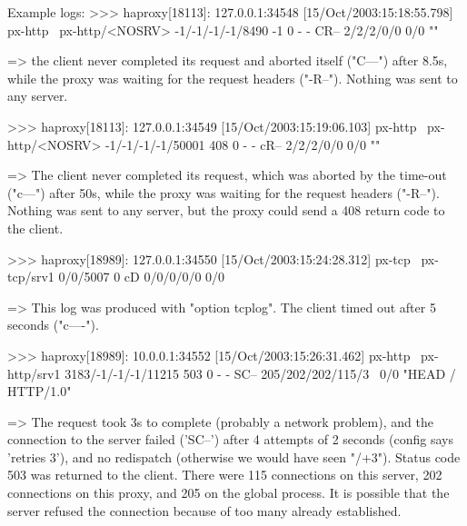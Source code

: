 \begin{example}{Example logs:}
    >>> haproxy[18113]: 127.0.0.1:34548 [15/Oct/2003:15:18:55.798] px-http \
          px-http/<NOSRV> -1/-1/-1/-1/8490 -1 0 - - CR-- 2/2/2/0/0 0/0 ""

    => the client never completed its request and aborted itself ("C---") after
       8.5s, while the proxy was waiting for the request headers ("-R--").
       Nothing was sent to any server.

    >>> haproxy[18113]: 127.0.0.1:34549 [15/Oct/2003:15:19:06.103] px-http \
         px-http/<NOSRV> -1/-1/-1/-1/50001 408 0 - - cR-- 2/2/2/0/0 0/0 ""

    => The client never completed its request, which was aborted by the
       time-out ("c---") after 50s, while the proxy was waiting for the request
       headers ("-R--").  Nothing was sent to any server, but the proxy could
       send a 408 return code to the client.

    >>> haproxy[18989]: 127.0.0.1:34550 [15/Oct/2003:15:24:28.312] px-tcp \
          px-tcp/srv1 0/0/5007 0 cD 0/0/0/0/0 0/0

    => This log was produced with "option tcplog". The client timed out after
       5 seconds ("c----").

    >>> haproxy[18989]: 10.0.0.1:34552 [15/Oct/2003:15:26:31.462] px-http \
          px-http/srv1 3183/-1/-1/-1/11215 503 0 - - SC-- 205/202/202/115/3 \
          0/0 "HEAD / HTTP/1.0"

    => The request took 3s to complete (probably a network problem), and the
       connection to the server failed ('SC--') after 4 attempts of 2 seconds
       (config says 'retries 3'), and no redispatch (otherwise we would have
       seen "/+3"). Status code 503 was returned to the client. There were 115
       connections on this server, 202 connections on this proxy, and 205 on
       the global process. It is possible that the server refused the
       connection because of too many already established.
\end{example}

